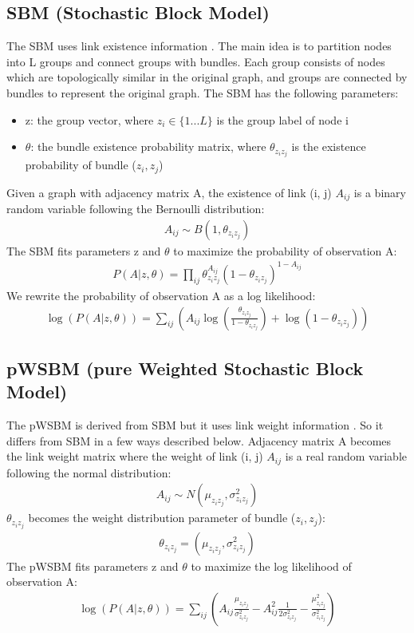 \documentclass{article} %
\begin{document}
\subsection{SBM (Stochastic Block Model)}
The SBM uses link existence information \citep{holland1983stochastic}.
The main idea is to partition nodes into L groups and connect groups with bundles.
Each group consists of nodes which are topologically similar in the original graph, and groups are connected by bundles to represent the original graph.
The SBM has the following parameters:
\begin{itemize}
	\item z: the group vector,
	where $ z_i \in \{ 1 ... L \} $ is the group label of node i
	\item $ \theta $: the bundle existence probability matrix,
	where $ \theta_{z_i z_j} $ is the existence probability of bundle ($z_i, z_j$)
\end{itemize}
Given a graph with adjacency matrix A, the existence of link (i, j) $ A_{ij} $ is a binary random variable following the Bernoulli distribution:
\begin{align*}
A_{ij} \sim B(1, \theta_{z_i z_j})
\end{align*}
The SBM fits parameters z and $ \theta $
to maximize the probability of observation A:
\begin{align*}
P(A|z, \theta) 
= \prod_{ij} \theta_{z_i z_j}^{A_{ij}}(1-\theta_{z_i z_j})^{1-A_{ij}}
\end{align*}
We rewrite the probability of observation A as a log likelihood:
\begin{align*}
\log(P(A|z, \theta))
= \sum_{ij} (A_{ij} \log(\frac{\theta_{z_i z_j}}{1-\theta_{z_i z_j}}) + \log(1-\theta_{z_i z_j}))
\end{align*}

\subsection{pWSBM (pure Weighted Stochastic Block Model)}
The pWSBM is derived from SBM but it uses link weight information \citep{aicher2014learning}.
So it differs from SBM in a few ways described below.
Adjacency matrix A becomes the link weight matrix where the weight of link (i, j)  $ A_{ij} $ is a real random variable following the normal distribution:
\begin{align*}
A_{ij} \sim N(\mu_{z_i z_j}, \sigma_{z_i z_j}^2)
\end{align*}
$ \theta_{z_i z_j} $ becomes the weight distribution parameter of bundle ($z_i, z_j$):
\begin{align*}
\theta_{z_i z_j} = (\mu_{z_i z_j}, \sigma_{z_i z_j}^2)
\end{align*}
The pWSBM fits parameters z and $ \theta $
to maximize the log likelihood of observation A:
\begin{align*}
\log(P(A|z, \theta))
= \sum_{ij} (
A_{ij} \frac{\mu_{z_i z_j}}{\sigma_{z_i z_j}^2}
- A_{ij}^2 \frac{1}{2\sigma_{z_i z_j}^2}
- \frac{\mu_{z_i z_j}^2}{\sigma_{z_i z_j}^2}
)
\end{align*}
\end{document}
